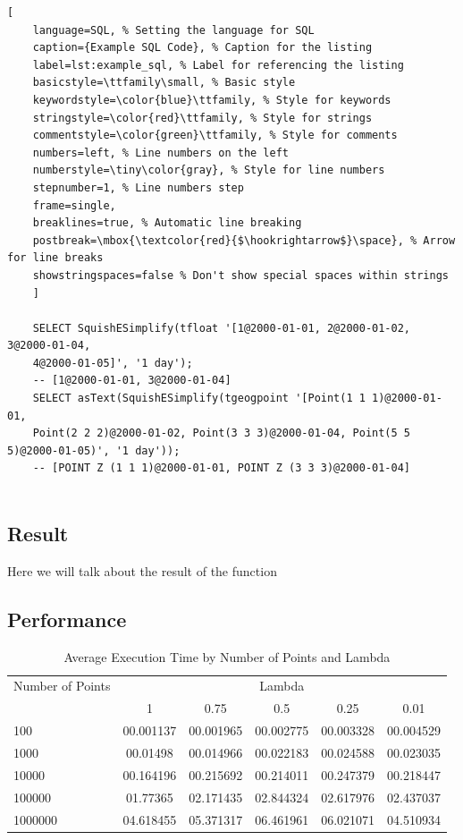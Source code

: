 \documentclass[twoside,12pt, a4paper]{report}
\begin{document}
\begin{lstlisting}[
	language=SQL, % Setting the language for SQL
	caption={Example SQL Code}, % Caption for the listing
	label=lst:example_sql, % Label for referencing the listing
	basicstyle=\ttfamily\small, % Basic style
	keywordstyle=\color{blue}\ttfamily, % Style for keywords
	stringstyle=\color{red}\ttfamily, % Style for strings
	commentstyle=\color{green}\ttfamily, % Style for comments
	numbers=left, % Line numbers on the left
	numberstyle=\tiny\color{gray}, % Style for line numbers
	stepnumber=1, % Line numbers step
	frame=single,
	breaklines=true, % Automatic line breaking
	postbreak=\mbox{\textcolor{red}{$\hookrightarrow$}\space}, % Arrow for line breaks
	showstringspaces=false % Don't show special spaces within strings
	]
	
	SELECT SquishESimplify(tfloat '[1@2000-01-01, 2@2000-01-02, 3@2000-01-04,
	4@2000-01-05]', '1 day');
	-- [1@2000-01-01, 3@2000-01-04]
	SELECT asText(SquishESimplify(tgeogpoint '[Point(1 1 1)@2000-01-01,
	Point(2 2 2)@2000-01-02, Point(3 3 3)@2000-01-04, Point(5 5 5)@2000-01-05)', '1 day'));
	-- [POINT Z (1 1 1)@2000-01-01, POINT Z (3 3 3)@2000-01-04]
	
\end{lstlisting}

\subsection{Result}

Here we will talk about the result of the function

\subsection{Performance}

\begin{table}[htbp]
	\centering
	\caption{Average Execution Time by Number of Points and Lambda}
	\label{tab:execution_time}
	\begin{tabular}{@{}lccccc@{}}
		\toprule
		Number of Points & \multicolumn{5}{c}{Lambda} \\
		\cmidrule{2-6}
		& 1         & 0.75       & 0.5        & 0.25       & 0.01       \\
		\midrule
		100              & 00.001137 & 00.001965 & 00.002775 & 00.003328 & 00.004529 \\
		1000             & 00.01498  & 00.014966 & 00.022183 & 00.024588 & 00.023035 \\
		10000            & 00.164196 & 00.215692 & 00.214011 & 00.247379 & 00.218447 \\
		100000           & 01.77365  & 02.171435 & 02.844324 & 02.617976 & 02.437037 \\
		1000000          & 04.618455 & 05.371317 & 06.461961 & 06.021071 & 04.510934 \\
		\bottomrule
	\end{tabular}
\end{table}
\end{document}
